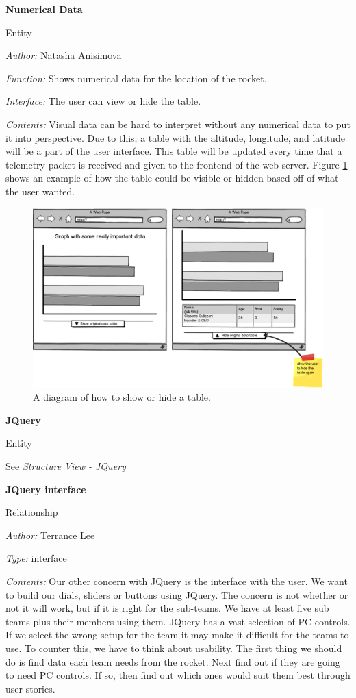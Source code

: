 \documentclass[10pt,draftclsnofoot,onecolumn]{IEEEtran}
\newcommand{\newinterface}[5]{

		\noindent\textbf{#2}
		
		\noindent Entity
		
		\noindent\textit{Author:} {#1}
		
		\noindent\textit{Function:} {#3}
		
		\noindent\textit{Interface:} {#4}		

		\noindent\textit{Contents:} {#5}
		\vspace{.5cm}
}
\newcommand{\newrelationship}[4]{
	\noindent\textbf{#2}
	
	\noindent Relationship
	
	\noindent\textit{Author:} #1

	\noindent\textit{Type:} #3

	\noindent\textit{Contents:} #4

	\vspace{.5cm}
}
\newcommand{\entityref}[2]{

	\noindent\textbf{#1}
	
	\noindent Entity
	
	\noindent See \textit{#2}

	\vspace{.5cm}
}
\begin{document}
\newpage
	\newinterface
	{Natasha Anisimova}
	{Numerical Data}
	{Shows numerical data for the location of the rocket.}
	{The user can view or hide the table.}
	{
		Visual data can be hard to interpret without any numerical data to put it into perspective. Due to this, a table with the altitude, longitude, and latitude will be a part of the user interface. This table will be updated every time that a telemetry packet is received and given to the frontend of the web server.
		Figure \ref{fig:3} shows an example of how the table could be visible or hidden based off of what the user wanted.
	}
	\begin{center}
	\begin{figure}
		\centering\includegraphics[width=\linewidth]{hideshowtable.eps}
		\caption{A diagram of how to show or hide a table.}
		\label{fig:3}
	\end{figure}
	\end{center}

\entityref{JQuery}
	{Structure View - JQuery}
    
\newrelationship
	{Terrance Lee}
	{JQuery interface}
	{interface}
	{ Our other concern with JQuery is the interface with the user. We want to build our dials, sliders or buttons using JQuery.  The concern is not whether or not it will work, but if it is right for the sub-teams.  We have at least five sub teams plus their members using them.  JQuery has a vast selection of PC controls. If we select the wrong setup for the team it may make it difficult for the teams to use. To counter this, we have to think about usability.  The first thing we should do is find data each team needs from the rocket.  Next find out if they are going to need PC controls. If so, then find out which ones would suit them best through user stories.  }	
	
\end{document}
